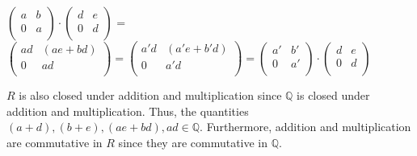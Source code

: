 $\left(%
\begin{array}{cc}
  a & b \\
  0 & a \\
\end{array}%
\right) \cdot 
    \left(%
    \begin{array}{cc}
      d & e \\
      0 & d \\
    \end{array}%
    \right)$ = 
    $\left(%
    \begin{array}{cc}
      ad & (ae + bd) \\
      0 & ad \\
    \end{array}%
    \right) =
    \left(%
    \begin{array}{cc}
      a'd & (a'e + b'd) \\
      0 & a'd \\
    \end{array}%
    \right) =
    \left(%
\begin{array}{cc}
  a' & b' \\
  0 & a' \\
\end{array}%
\right) \cdot
    \left(%
    \begin{array}{cc}
      d & e \\
      0 & d \\
    \end{array}%
    \right)$
\vspace{3 mm}

$R$ is also closed under addition and multiplication since $\mathbb{Q}$ is closed under addition and multiplication. Thus, the quantities $(a+d), (b+e), (ae+bd), ad \in \mathbb{Q}$. Furthermore, addition and multiplication are commutative in $R$ since they are commutative in $\mathbb{Q}$.

